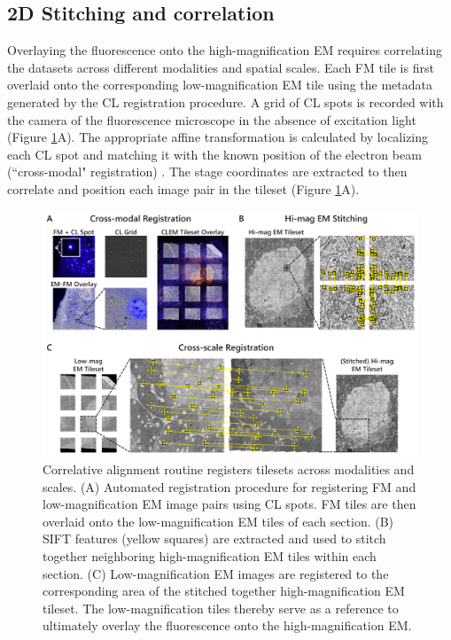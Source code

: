 \subsection{2D Stitching and correlation}
\label{sec:3R_stitching}
Overlaying the fluorescence onto the high-magnification EM requires correlating the datasets across different modalities and spatial scales. Each FM tile is first overlaid onto the corresponding low-magnification EM tile using the metadata generated by the CL registration procedure. A grid of CL spots is recorded with the camera of the fluorescence microscope in the absence of excitation light (Figure \ref{fig:3.3_reconstruction}A). The appropriate affine transformation is calculated by localizing each CL spot and matching it with the known position of the electron beam (``cross-modal" registration) \cite{haring2017automated}. The stage coordinates are extracted to then correlate and position each image pair in the tileset (Figure \ref{fig:3.3_reconstruction}A).

\begin{figure}[!tb]
    \centering
    \includegraphics[width=\linewidth]{chapter-3/figures_PDF/fig3-3_reconstruction.pdf}
    \caption{Correlative alignment routine registers tilesets across modalities and scales.
    (A) Automated registration procedure for registering FM and low-magnification EM image pairs using CL spots. FM tiles are then overlaid onto the low-magnification EM tiles of each section.
    (B) SIFT features (yellow squares) are extracted and used to stitch together neighboring high-magnification EM tiles within each section.
    (C) Low-magnification EM images are registered to the corresponding area of the stitched together high-magnification EM tileset. The low-magnification tiles thereby serve as a reference to ultimately overlay the fluorescence onto the high-magnification EM.}
    \label{fig:3.3_reconstruction}
\end{figure}

